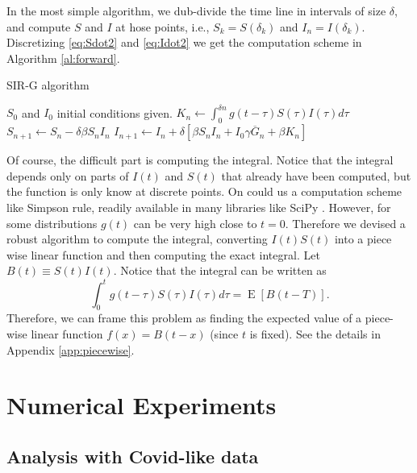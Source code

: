 \documentclass[twoside,USenglish,10pt]{article}
\newcommand{\Gb}{\overline{G}\xspace}
\DeclareMathOperator{\Exp}{E}       %
\newcommand{\E}[1]{\Exp\left[{#1}\right]}       %
\begin{document}
In the most simple algorithm, we dub-divide the time line in intervals of size $\delta$, and compute $S$ and $I$ at hose points, i.e., $S_k=S(\delta_k)$ and $I_n=I(\delta_k)$. Discretizing \eqref{eq:Sdot2} and \eqref{eq:Idot2} we get the computation scheme in Algorithm \ref{al:forward}.

\begin{algorithm}
    \caption{SIR-G algorithm}
    \label{al:simple}
    \begin{algorithmic}[1] %
		\State	$S_0$ and $I_0$  initial conditions given.
			\State $K_n \gets \int_0^{\delta n} g(t-\tau) S(\tau)I(\tau)d\tau$  
			\State $S_{n+1} \gets  S_n - \delta\beta S_n I_n$
			\State $I_{n+1} \gets  I_n + \delta\left[\beta S_n I_n + I_0\gamma\Gb_n + \beta K_n\right]$
		\EndFor	
    \end{algorithmic}
    \label{al:forward}
\end{algorithm}


Of course, the difficult part is computing the integral. Notice that the integral depends only on parts of $I(t)$ and $S(t)$ that already have been computed, but the function is only know at discrete points.
On could us a computation scheme like Simpson rule, readily available in many libraries like SciPy \cite{jon.ea.01}. However, for some distributions $g(t)$ can be very high close to $t=0$. Therefore we devised a robust algorithm to compute the integral, converting $I(t)S(t)$ into a piece wise linear function and then computing the exact integral. Let $B(t)\equiv S(t)I(t)$. Notice that the integral can be written as
\[ \int_0^{t} g(t-\tau) S(\tau)I(\tau)d\tau = \E{B(t-T)}.  \]
Therefore, we can frame this problem as finding the expected value of a piece-wise linear function $f(x)=B(t-x)$ (since $t$ is fixed). See the details in Appendix \ref{app:piecewise}.

\section{Numerical Experiments}\label{sc:numerical}

\subsection{Analysis with Covid-like data}
\end{document}
